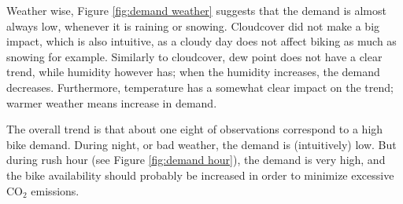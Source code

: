     Weather wise, Figure \ref{fig:demand weather} suggests that the demand is almost always low, whenever it is raining or snowing. Cloudcover did not make a big impact, which is also intuitive, as a cloudy day does not affect biking as much as snowing for example. Similarly to cloudcover, dew point does not have a clear trend, while humidity however has; when the humidity increases, the demand decreases. Furthermore, temperature has a somewhat clear impact on the trend; warmer weather means increase in demand.

    The overall trend is that about one eight of observations correspond to a high bike demand. During night, or bad weather, the demand is (intuitively) low. But during rush hour (see Figure \ref{fig:demand hour}), the demand is very high, and the  bike availability should probably be increased in order to minimize excessive CO$_2$ emissions.